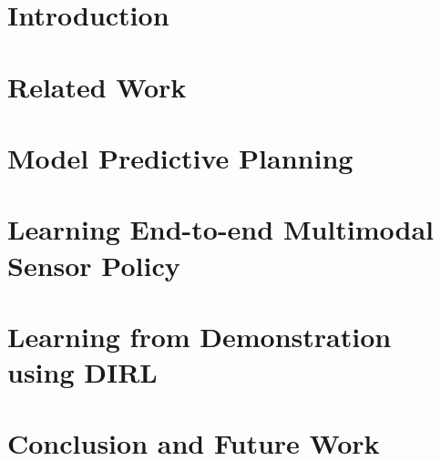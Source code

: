 \documentclass[hidelinks, 12pt]{cmuthesis}
\begin{document}
\mainmatter


%
%
%
%
%


\chapter{Introduction}


\chapter{Related Work} \label{chap:related_work}


\chapter{Model Predictive Planning} \label{chap:rrtplanner}


\chapter{Learning End-to-end Multimodal Sensor Policy} \label{chap:multimodalDRL}


\chapter{Learning from Demonstration using DIRL} \label{chap:dirl}


\chapter{Conclusion and Future Work} \label{chap:conclusion}

\end{document}
